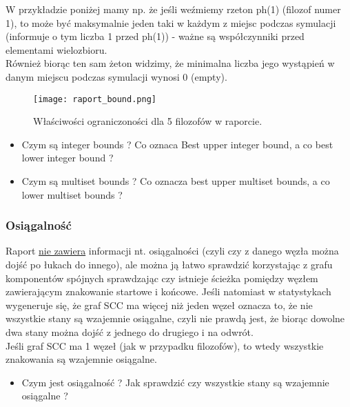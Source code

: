 \documentclass[a4paper,15pt]{article}
\begin{document}
W przykładzie poniżej mamy np. że jeśli weźmiemy rzeton ph(1) (filozof numer 1), to może być maksymalnie jeden taki w każdym z miejsc podczas symulacji (informuje o tym liczba 1 przed ph(1)) - ważne są współczynniki przed elementami wielozbioru. \\
Również biorąc ten sam żeton widzimy, że minimalna liczba jego wystąpień w danym miejscu podczas symulacji wynosi 0 (empty).


\begin{figure}[H]
\centerline{\texttt{[image: raport\_bound.png]}}
\caption{Właściwości ograniczoności dla 5 filozofów w raporcie.}
\label{fig:raport_bound}
\end{figure}

\begin{framed}
\begin{itemize}
\item Czym są integer bounds ? Co oznaca Best upper integer bound, a co best lower integer bound ?
\item Czym są multiset bounds ? Co oznacza best upper multiset bounds, a co lower multiset bounds ?
\end{itemize}
\end{framed}



\subsubsection{Osiągalność}
Raport \underline{nie zawiera} informacji nt. osiągalności (czyli czy z danego węzła można dojść po łukach do innego), ale można ją łatwo sprawdzić korzystając z grafu komponentów spójnych sprawdzając czy istnieje ścieżka pomiędzy węzłem zawierającym znakowanie startowe i końcowe. Jeśli natomiast w statystykach wygeneruje się, że graf SCC ma więcej niż jeden węzeł oznacza to, że nie wszystkie stany są wzajemnie osiągalne, czyli nie prawdą jest, że biorąc dowolne dwa stany można dojść z jednego do drugiego i na odwrót. \\
Jeśli graf SCC ma 1 węzeł (jak w przypadku filozofów), to wtedy wszystkie znakowania są wzajemnie osiągalne.

\begin{framed}
\begin{itemize}
\item Czym jest osiągalność ? Jak sprawdzić czy wszystkie stany są wzajemnie osiągalne ?
\end{itemize}
\end{framed}
\end{document}
